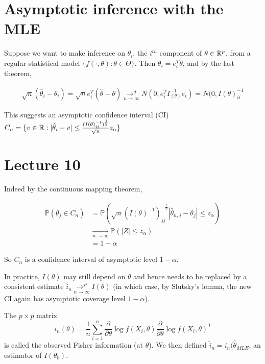\documentclass[a4paper]{article}
\begin{document}
\section{Asymptotic inference with the MLE}

Suppose we want to make inference on $\theta_i$, the $i^{th}$ component of $\theta \in \mathbb{R}^{p}$, from a regular statistical model $\{f\left( \cdot , \theta \right) : \theta \in \Theta \}$. Then $\theta_i = e_i ^{T} \theta$, and by the last theorem,

\begin{align*}
	\sqrt{n} (\hat{\theta}_i - \theta_i) = \sqrt{n} e_i ^{T} (\hat{\theta} - \theta) \underset{n\to \infty}{\to ^{d}} N(0, e_i ^{T} I_(\theta)^{-1} e_i) = N(0, I(\theta)^{-1}_{ii}  
\end{align*}

This suggests an asymptotic confidence interval (CI) $C_n = \{v \in \mathbb{R} : |\hat{\theta}_i - v| \le  \frac{(I(\theta)^{-1}_{ii})^{\frac{1}{2}}}{\sqrt{n} } z_{\alpha}\} $

\section*{Lecture 10}

Indeed by the continuous mapping theorem,

\begin{align*}
	\mathbb{P}\left( \theta_j \in C_n \right) &= \mathbb{P}\left( \sqrt{n} (I(\theta)^{-1})^{- \frac{1}{2}}_{jj}  |\hat{\theta}_{n,j} - \theta_j| \le  z_{\alpha}\right) \\
	&\underset{n\to \infty}{\to } \mathbb{P}\left( |Z| \le z_{\alpha} \right) \\
	&= 1- \alpha
\end{align*}

So $C_n$ is a confidence interval of asymptotic level $1-\alpha$.

In practice,  $I(\theta)$ may still depend on  $\theta$ and hence needs to be replaced by a consistent estimate $\hat{i}_{n} \underset{n\to \infty}{\to ^{P}}  I(\theta)$ (in which case, by Slutsky's lemma, the new CI again has asymptotic coverage level $1-\alpha$).

 \begin{defn}
	The $p\times p$ matrix
	\[
		i_n(\theta) = \frac{1}{n}\sum_{i=1}^{n} \frac{\partial }{\partial \theta} \log f(X_i, \theta) \frac{\partial }{\partial \theta} \log f(X_i, \theta)^{T} 
	\] 
	is called the observed Fisher information (at $\theta$).
	We then defined  $\hat{i}_n = i_n(\hat{\theta}_{MLE}$, an estimator of $I(\theta_0)$.
\end{defn}
\end{document}
